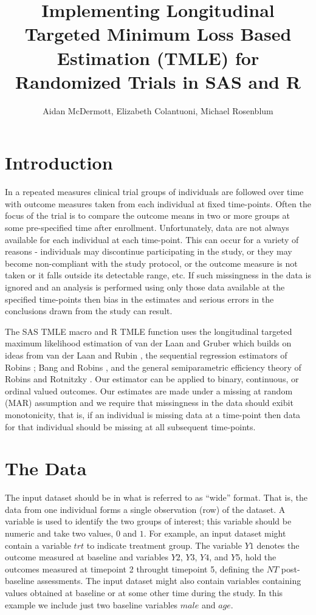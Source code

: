 \documentclass[10pt]{article}
\title{Implementing Longitudinal Targeted Minimum Loss Based Estimation (TMLE) for Randomized Trials in SAS and R}
\author{Aidan McDermott, Elizabeth Colantuoni, Michael Rosenblum}
\begin{document}
\maketitle

\setlength{\abovedisplayskip}{2pt}
\setlength{\belowdisplayskip}{2pt}

\section*{Introduction}

In a repeated measures clinical trial groups of individuals are followed over time with outcome measures taken from each individual at fixed time-points.  Often the focus of the trial is to compare the outcome means in two or more groups at some pre-specified time after enrollment.  Unfortunately, data are not always available for each individual at each time-point.  This can occur for a variety of reasons - individuals may discontinue participating in the study, or they may become non-compliant with the study protocol, or the outcome measure is not taken or it falls outside its detectable range, etc.  If such missingness in the data is ignored and an analysis is performed using only those data available at the specified time-points then bias in the estimates and serious errors in the conclusions drawn from the study can result.

The SAS TMLE macro and R TMLE function uses the longitudinal targeted maximum likelihood estimation of van der Laan and Gruber \cite{vanderLaan2012} which builds on ideas from van der Laan and Rubin \cite{vanderLaan2006}, the sequential regression estimators of Robins \cite{Robins1999}; Bang and Robins \cite{Bang2005}, and the general semiparametric efficiency theory of Robins and Rotnitzky \cite{Robins1992}.  Our estimator can be applied to binary, continuous, or ordinal valued outcomes. Our estimates are made under a missing at random (MAR) assumption and we require that missingness in the data should exibit monotonicity, that is, if an individual is missing data at a time-point then data for that individual should be missing at all subsequent time-points.

\section*{The Data}

The input dataset should be in what is referred to as ``wide'' format. That is, the data from one individual forms a single observation (row) of the dataset.  A variable is used to identify the two groups of interest; this variable should be numeric and take two values, $0$ and $1$.  For example, an input dataset might contain a variable $trt$ to indicate treatment group.  The variable $Y1$ denotes the outcome measured at baseline and variables $Y2$, $Y3$, $Y4$, and $Y5$, hold the outcomes measured at timepoint 2 throught timepoint 5, defining the $NT$ post-baseline assessments.  The input dataset might also contain variables containing values obtained at baseline or at some other time during the study.  In this example we include just two baseline variables $male$ and $age$.
\vspace{0.1in}
\end{document}
